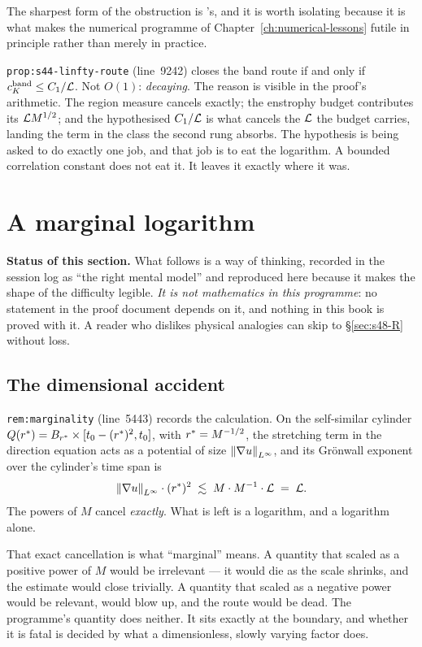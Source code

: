 The sharpest form of the obstruction is 's, and it is worth isolating
because it is what makes the numerical programme of
Chapter~\ref{ch:numerical-lessons} futile in principle rather than merely in
practice.

\texttt{prop:s44-linfty-route} (line~9242) closes the band route if and only
if \(c_K^{\mathrm{band}}\le C_1/\mathcal{L}\). Not \(O(1)\): \emph{decaying}. The
reason is visible in the proof's arithmetic. The region measure cancels
exactly; the enstrophy budget contributes its \(\mathcal{L} M^{1/2}\); and the
hypothesised \(C_1/\mathcal{L}\) is what cancels the \(\mathcal{L}\) the budget carries,
landing the term in the class the second rung absorbs. The hypothesis is being
asked to do exactly one job, and that job is to eat the logarithm. A bounded
correlation constant does not eat it. It leaves it exactly where it was.

\section{A marginal logarithm}
\label{sec:marginality-rg}

\begin{record}
\textbf{Status of this section.} What follows is a way of thinking, recorded
in the  session log as ``the right mental model'' and reproduced here
because it makes the shape of the difficulty legible. \emph{It is not
mathematics in this programme}: no statement in the proof document depends on
it, and nothing in this book is proved with it. A reader who dislikes physical
analogies can skip to \S\ref{sec:s48-R} without loss.
\end{record}

\subsection{The dimensional accident}

\texttt{rem:marginality} (line~5443) records the calculation. On the
self-similar cylinder \(Q(r^{*})=B_{r^{*}}\times[t_0-(r^{*})^2,t_0]\), with
\(r^{*}=M^{-1/2}\), the stretching term in the direction equation acts as a
potential of size \(\left\|\nabla u\right\|_{L^\infty}\), and its Gr\"onwall exponent
over the cylinder's time span is
\[
  \left\|\nabla u\right\|_{L^\infty}\cdot(r^{*})^2
  \;\lesssim\; M\cdot M^{-1}\cdot\mathcal{L} \;=\; \mathcal{L} .
\]
The powers of \(M\) cancel \emph{exactly}. What is left is a logarithm, and a
logarithm alone.

That exact cancellation is what ``marginal'' means. A quantity that scaled as
a positive power of \(M\) would be irrelevant --- it would die as the scale
shrinks, and the estimate would close trivially. A quantity that scaled as a
negative power would be relevant, would blow up, and the route would be dead.
The programme's quantity does neither. It sits exactly at the boundary, and
whether it is fatal is decided by what a dimensionless, slowly varying factor
does.

